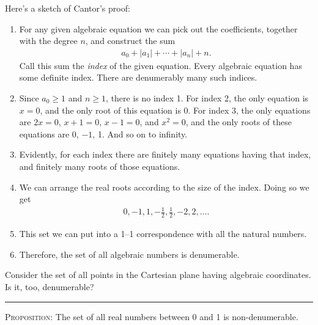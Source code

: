 \documentclass[twoside,openright]{article}
\begin{document}
\begin{enumerate}
Here's a sketch of Cantor's proof:
\begin{enumerate}[(1)]
\item For any given algebraic equation we can pick out the
  coefficients, together with the degree $n$, and construct the sum
  \begin{align*}
    a_0+|a_1|+\dotsb+|a_n|+n.
  \end{align*}
  Call this sum the \emph{index} of the given equation. Every
  algebraic equation has some definite index. There are denumerably
  many such indices.
\item Since $a_0\geq1$ and $n\geq1$, there is no index 1. For index 2,
  the only equation is $x=0$, and the only root of this equation is
  0. For index 3, the only equations are $2x=0$, $x+1=0$, $x-1=0$, and
  $x^2=0$, and the only roots of these equations are 0, $-1$, 1. And
  so on to infinity.

\item Evidently, for each index there are finitely many equations
  having that index, and finitely many roots of those equations.

\item We can arrange the real roots according to the size of the
  index. Doing so we get
  \begin{align*}
    0, {\scriptstyle -}1, 1, {\scriptstyle -}\tfrac{1}{2}, \tfrac{1}{2}, {\scriptstyle -}2, 2, \ldots.
  \end{align*}
\item This set we can put into a 1--1 correspondence with all the
  natural numbers.
\item Therefore, the set of all algebraic numbers is denumerable.
\end{enumerate}
Consider the set of all points in the Cartesian plane having algebraic
coordinates. Is it, too, denumerable?\label{algebraiccoordinates}

\noindent\rule[0.7ex]{\linewidth}{0.5pt}
\begin{sloppypar}
\item \textsc{Proposition}\label{decimal}: The set of all real numbers
  between 0 and 1 is non-denumerable.
\end{sloppypar}


\end{enumerate}
\end{document}

